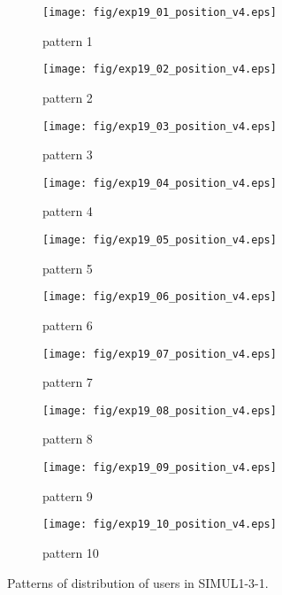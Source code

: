 	\begin{figure}
		\begin{center}
			\begin{subfigure}[b]{0.32\textwidth}
				\texttt{[image: fig/exp19\_01\_position\_v4.eps]}
				\caption{pattern 1}
				\label{figure:simul1_3_1_a}
			\end{subfigure}
			\begin{subfigure}[b]{0.32\textwidth}
				\texttt{[image: fig/exp19\_02\_position\_v4.eps]}
				\caption{pattern 2}
				\label{figure:simul1_3_1_b}
			\end{subfigure}
			\begin{subfigure}[b]{0.32\textwidth}
				\texttt{[image: fig/exp19\_03\_position\_v4.eps]}
				\caption{pattern 3}
				\label{figure:simul1_3_1_c}
			\end{subfigure}
			\begin{subfigure}[b]{0.32\textwidth}
				\texttt{[image: fig/exp19\_04\_position\_v4.eps]}
				\caption{pattern 4}
				\label{figure:simul1_3_1_d}
			\end{subfigure}
			\begin{subfigure}[b]{0.32\textwidth}
				\texttt{[image: fig/exp19\_05\_position\_v4.eps]}
				\caption{pattern 5}
				\label{figure:simul1_3_1_e}
			\end{subfigure}
			\begin{subfigure}[b]{0.32\textwidth}
				\texttt{[image: fig/exp19\_06\_position\_v4.eps]}
				\caption{pattern 6}
				\label{figure:simul1_3_1_f}
			\end{subfigure}
			\begin{subfigure}[b]{0.32\textwidth}
				\texttt{[image: fig/exp19\_07\_position\_v4.eps]}
				\caption{pattern 7}
				\label{figure:simul1_3_1_g}
			\end{subfigure}
			\begin{subfigure}[b]{0.32\textwidth}
				\texttt{[image: fig/exp19\_08\_position\_v4.eps]}
				\caption{pattern 8}
				\label{figure:simul1_3_1_h}
			\end{subfigure}
			\begin{subfigure}[b]{0.32\textwidth}
				\texttt{[image: fig/exp19\_09\_position\_v4.eps]}
				\caption{pattern 9}
				\label{figure:simul1_3_1_i}
			\end{subfigure}
			\begin{subfigure}[b]{0.32\textwidth}
				\texttt{[image: fig/exp19\_10\_position\_v4.eps]}
				\caption{pattern 10}
				\label{figure:simul1_3_1_j}
			\end{subfigure}
			\caption{Patterns of distribution of users in SIMUL1-3-1.}
			\label{figure:simul1_3_1_p}
		\end{center}
	\end{figure}
	
